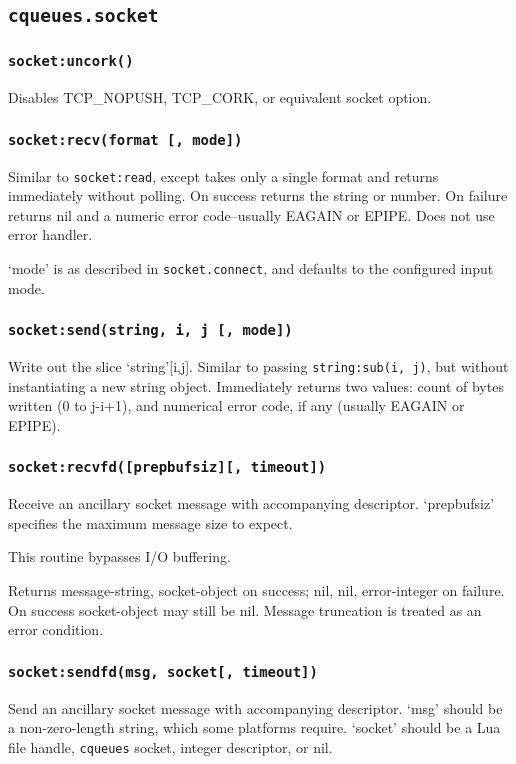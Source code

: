 \documentclass[11pt, oneside]{memoir}
\newcommand*{\cqueues}[0]{\texttt{cqueues}\xspace}
\newcommand*{\fn}[1]{\texttt{#1}\xspace}
\newcommand*{\method}[1]{\texttt{#1}\xspace}
\newcounter{toccols}
\newenvironment{Module}[1]{
	\subsection{\texttt{#1}}
	\addtocontents{toc}{
		\protect\begin{multicols}{\value{toccols}}
	}
}{
	\addtocontents{toc}{\protect\end{multicols}}
}
\begin{document}
\begin{Module}{cqueues.socket}
\subsubsection[\fn{socket:uncork}]{\fn{socket:uncork()}}
Disables TCP\_NOPUSH, TCP\_CORK, or equivalent socket option.

\subsubsection[\fn{socket:recv}]{\fn{socket:recv(format [, mode])}}
Similar to \method{socket:read}, except takes only a single format and returns immediately without polling. On success returns the string or number. On failure returns nil and a numeric error code--usually EAGAIN or EPIPE. Does not use error handler.

`mode' is as described in \fn{socket.connect}, and defaults to the configured input mode.

\subsubsection[\fn{socket:send}]{\fn{socket:send(string, i, j [, mode])}}
Write out the slice `string'[i,j]. Similar to passing \fn{string:sub(i, j)}, but without instantiating a new string object. Immediately returns two values: count of bytes written (0 to j-i+1), and numerical error code, if any (usually EAGAIN or EPIPE).

\subsubsection[\fn{socket:recvfd}]{\fn{socket:recvfd([prepbufsiz][, timeout])}}
Receive an ancillary socket message with accompanying descriptor. `prepbufsiz' specifies the maximum message size to expect.

This routine bypasses I/O buffering.

Returns message-string, socket-object on success; nil, nil, error-integer on failure. On success socket-object may still be nil. Message truncation is treated as an error condition.

\subsubsection[\fn{socket:sendfd}]{\fn{socket:sendfd(msg, socket[, timeout])}}
Send an ancillary socket message with accompanying descriptor. `msg' should be a non-zero-length string, which some platforms require. `socket' should be a Lua file handle, \cqueues socket, integer descriptor, or nil.


\end{Module}
\end{document}
